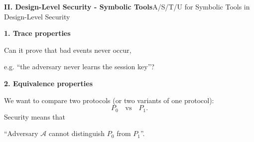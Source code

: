 \documentclass[10pt,aspectratio=1610,compress,dvipsnames]{beamer}
\begin{document}
\begin{frame}[fragile]{\bfseries II. Design-Level Security - Symbolic Tools}{A/S/T/U for Symbolic Tools in Design-Level Security}
\begin{description}[style=nextline]
	\item[\textbf{Scope (S)}] \textbf{1. Trace properties} \\
	\item[$\to$] Can it prove that bad events never occur, 
	\item[$\to$] e.g. ``the adversary never learns the session key''?
	\item[]
	\item[] \textbf{2. Equivalence properties}\\
	\item[]
\end{description}
We want to compare two protocols (or two variants of one protocol): \[
P_0\quad\text{vs}\quad P_1.
\] Security means that \begin{center}
	``Adversary $\mathcal A$ cannot distinguish $P_0$ from $P_1$''.
\end{center}

\end{frame}
\end{document}
